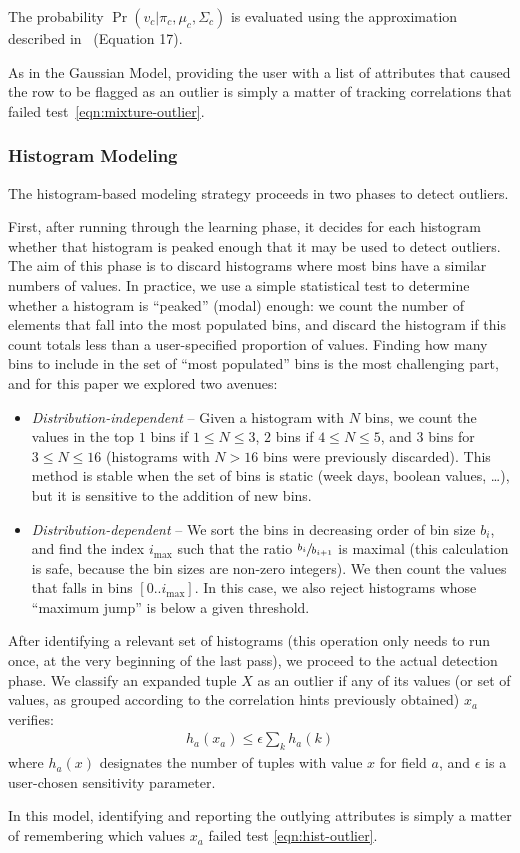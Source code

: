 The probability $\Pr(v_c | \pi_c, \mu_c, \Sigma_c)$ is evaluated using the approximation described in~\cite{Roberts1999} (Equation 17).

As in the Gaussian Model, providing the user with a list of attributes that caused the row to be flagged as an outlier is simply a matter of tracking correlations that failed test~\ref{eqn:mixture-outlier}.

\subsubsection{Histogram Modeling}
The histogram-based modeling strategy proceeds in two phases to detect outliers.

First, after running through the learning phase, it decides for each histogram whether that histogram is peaked enough that it may be used to detect outliers. The aim of this phase is to discard histograms where most bins have a similar numbers of values. In practice, we use a simple statistical test to determine whether a histogram is ``peaked'' (modal) enough: we count the number of elements that fall into the most populated bins, and discard the histogram if this count totals less than a user-specified proportion of values. Finding how many bins to include in the set of ``most populated'' bins is the most challenging part, and for this paper we explored two avenues:

\begin{itemize}
\item \emph{Distribution-independent} -- Given a histogram with $N$ bins, we count the values in the top $1$ bins if $1 \leq N \leq 3$, $2$ bins if $4 \leq N \leq 5$, and $3$ bins for $3 \leq N \leq 16$ (histograms with $N > 16$ bins were previously discarded). This method is stable when the set of bins is static (week days, boolean values, \ldots), but it is sensitive to the addition of new bins.
\item \emph{Distribution-dependent} -- We sort the bins in decreasing order of bin size $b_i$, and find the index $i_{\max}$ such that the ratio $\sfrac{b_i}{b_{i+1}}$ is maximal (this calculation is safe, because the bin sizes are non-zero integers). We then count the values that falls in bins $[0 .. i_{\max}]$. In this case, we also reject histograms whose ``maximum jump'' is below a given threshold.
\end{itemize}

After identifying a relevant set of histograms (this operation only needs to run once, at the very beginning of the last pass), we proceed to the actual detection phase. We classify an expanded tuple $X$ as an outlier if any of its values (or set of values, as grouped according to the correlation hints previously obtained) $x_a$ verifies:
\begin{align}
h_a(x_a) \le \epsilon \sum_k h_a(k)
\label{eqn:hist-outlier}
\end{align}
where $h_a(x)$ designates the number of tuples with value $x$ for field $a$, and $\epsilon$ is a user-chosen sensitivity parameter.

In this model, identifying and reporting the outlying attributes is simply a matter of remembering which values $x_a$ failed test \ref{eqn:hist-outlier}.

